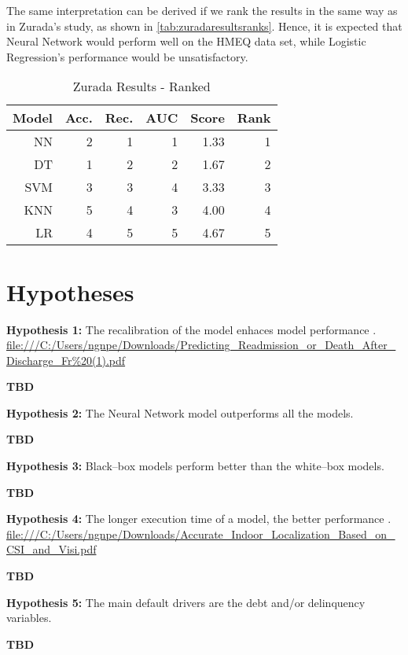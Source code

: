The same interpretation can be derived if we rank the results in the same way as in Zurada's study, as shown in \autoref{tab:zuradaresultsranks}.
Hence, it is expected that Neural Network would perform well on the HMEQ data set, while Logistic Regression's performance would be unsatisfactory.
\begin{table}[H]
    \small
    \setlength{\tabcolsep}{8pt}
    \renewcommand{\arraystretch}{1.3}
    \centering
    \caption[Zurada Results - Ranked]{Zurada Results - Ranked}\label{tab:zuradaresultsranks}
    \begin{tabular}{r r r r r r}
    \toprule
    Model & Acc. & Rec. & AUC & Score & Rank \\
    \midrule
    \hline
    NN & 2 & 1 & 1 & 1.33 & 1 \\ 
    DT & 1 & 2 & 2 & 1.67 & 2 \\ 
    SVM & 3 & 3 & 4 & 3.33 & 3 \\ 
    KNN & 5 & 4 & 3 & 4.00 & 4 \\ 
    LR & 4 & 5 & 5 & 4.67 & 5 \\ 
    \hline
    \bottomrule
    \end{tabular}
    \vspace{0.35em}
    
    \vspace{-1em}
\end{table}


\section{Hypotheses}

\noindent \textbf{Hypothesis 1:} The recalibration of the model enhaces model performance \citep{de2023predicting}.
\url{file:///C:/Users/ngnpe/Downloads/Predicting_Readmission_or_Death_After_Discharge_Fr%20(1).pdf}

\textbf{TBD}

\noindent \textbf{Hypothesis 2:} The Neural Network model outperforms all the models.

\textbf{TBD}

\noindent \textbf{Hypothesis 3:} Black--box models perform better than the white--box models.

\textbf{TBD}

\noindent \textbf{Hypothesis 4:} The longer execution time of a model, the better performance \citep{wu2018accurate}.
\url{file:///C:/Users/ngnpe/Downloads/Accurate_Indoor_Localization_Based_on_CSI_and_Visi.pdf}

\textbf{TBD}

\noindent \textbf{Hypothesis 5:} The main default drivers are the debt and/or delinquency variables.

\textbf{TBD}